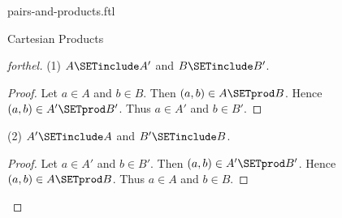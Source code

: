 \documentclass{naproche-library}
\begin{document}
\begin{smodule}[title=Ordered Pairs and Cartesian Products]{pairs-and-products.ftl}
\begin{sfragment}{Cartesian Products}
\begin{proof}[forthel]
    (1) $A \SETinclude A'$ and $B \SETinclude B'$.
    \begin{proof}
      Let $a \in A$ and $b \in B$.
      Then $(a,b) \in A \SETprod B$.
      Hence $(a,b) \in A' \SETprod B'$.
      Thus $a \in A'$ and $b \in B'$.
    \end{proof}

    (2) $A' \SETinclude A$ and $B' \SETinclude B$.
    \begin{proof}
      Let $a \in A'$ and $b \in B'$.
      Then $(a,b) \in A' \SETprod B'$.
      Hence $(a,b) \in A \SETprod B$.
      Thus $a \in A$ and $b \in B$.
    \end{proof}
  \end{proof}
\end{sfragment}
\end{smodule}
\end{document}
